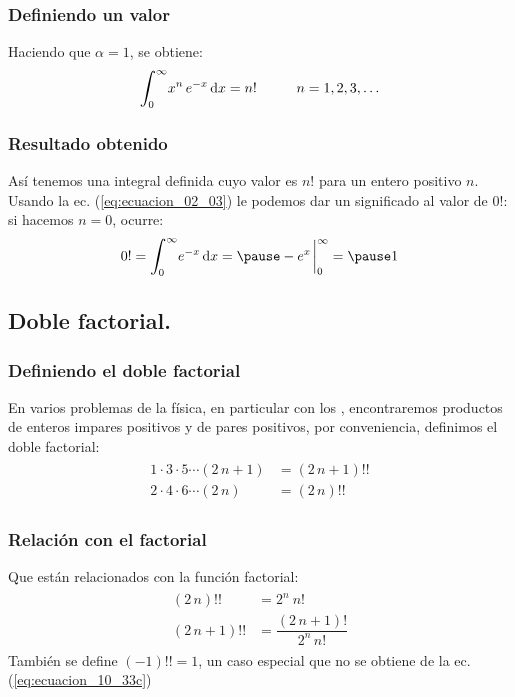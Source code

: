 \documentclass[12pt]{beamer}
\begin{document}
\begin{frame}
\frametitle{Definiendo un valor}
Haciendo que $\alpha = 1$, se obtiene:
\pause
\begin{align}
\scaleint{6ex}_{\bs 0}^{\infty} x^{n} \, e^{-x} \dd{x} = n! \hspace{1cm} n = 1, 2, 3, \ldots
\label{eq:ecuacion_02_03}
\end{align}
\end{frame}
\begin{frame}
\frametitle{Resultado obtenido}
Así tenemos una integral definida cuyo valor es $n!$ para un entero positivo $n$.
\\
\bigskip
\pause
Usando la ec. (\ref{eq:ecuacion_02_03}) le podemos dar un significado al valor de $0!$: si hacemos $n = 0$, ocurre:
\pause
\begin{eqnarray}
0! = \scaleint{6ex}_{\bs 0}^{\infty} e^{-x} \dd{x} = \pause -e^{x}\eval_{0}^{\infty} = \pause 1
\label{eq:ecuacion_02_04}
\end{eqnarray}
\end{frame}

\subsection{Doble factorial.}

\begin{frame}
\frametitle{Definiendo el doble factorial}
En varios problemas de la física, en particular con los , encontraremos productos de enteros impares positivos y de pares positivos, por conveniencia, definimos el doble factorial:
\pause
\begin{align}
\begin{aligned}
1 \cdot 3 \cdot 5 \cdots (2 \, n+1) &= (2 \, n+1) !! \\
2 \cdot 4 \cdot 6 \cdots (2 \, n) &= (2 \, n) !!
\end{aligned}
\label{eq:ecuacion_10_33b}
\end{align}
\end{frame}
\begin{frame}
\frametitle{Relación con el factorial}
Que están relacionados con la función factorial:
\pause
\begin{align}
\begin{aligned}
(2 \, n)!! &=  2^{n} \: n! \\[1em]
(2 \, n+1)!! &= \dfrac{(2 \, n+1)!}{2^{n} \, n!}
\end{aligned}
\label{eq:ecuacion_10_33c}
\end{align}
\pause
También se define $(-1)!! = 1$, un caso especial que no se obtiene de la ec. (\ref{eq:ecuacion_10_33c})
\end{frame}
\end{document}
